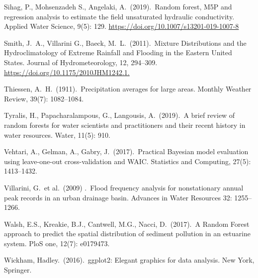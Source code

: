 \documentclass{svjour3}
\begin{document}
\begin{thebibliography}{9}
Sihag, P., Mohsenzadeh S.,  Angelaki, A.\ (2019).\ Random forest, M5P and regression analysis to estimate the field unsaturated hydraulic conductivity.
Applied Water Science, 9(5): 129.
\url{https://doi.org/10.1007/s13201-019-1007-8}

Smith, J.\ A., Villarini G., Baeck, M.\ L.\ (2011).\ Mixture Distributions and the Hydroclimatology of Extreme Rainfall and Flooding in the Eastern United States.
Journal of Hydrometeorology, 12, 294--309.
\url{https://doi.org/10.1175/2010JHM1242.1.}

Thiessen, A.\ H.\ (1911).\ Precipitation averages for large areas.
Monthly Weather Review, 39(7): 1082--1084.

Tyralis, H., Papacharalampous, G., Langousis, A.\ (2019).\
A brief review of random forests for water scientists and practitioners and their recent history in water resources.
Water, 11(5): 910.

Vehtari, A., Gelman, A.,  Gabry, J.\ (2017).\
Practical Bayesian model evaluation using leave-one-out cross-validation and WAIC\@.
Statistics and Computing, 27(5): 1413--1432.

Villarini, G.\ et al.\ (2009) .\ Flood frequency analysis for nonstationary annual peak records in an urban drainage basin.
Advances in Water Resources 32: 1255--1266.

Walsh, E.S., Kreakie, B.J., Cantwell, M.G.,  Nacci, D.\ (2017).\
A Random Forest approach to predict the spatial distribution of sediment pollution in an estuarine system.
PloS one, 12(7): e0179473.

\bibitem{ggplot}
Wickham, Hadley.\ (2016).\ ggplot2: Elegant graphics for data analysis.
New York, Springer.

\end{thebibliography}
\end{document}
